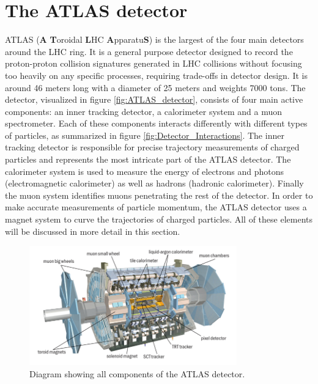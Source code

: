 \section{The ATLAS detector}

ATLAS (\textbf{A} \textbf{T}oroidal \textbf{L}HC \textbf{A}pparatu\textbf{S}) is the largest of the four main detectors 
around the LHC ring. It is a general purpose detector designed to record the proton-proton collision signatures 
generated in LHC collisions without focusing too heavily on any specific processes, requiring trade-offs in detector 
design. It is around 46 meters long with a diameter of 25 meters and weights 7000 tons. The detector, visualized in 
figure \ref{fig:ATLAS_detector}, consists of four main active components: an inner tracking detector, a calorimeter 
system and a muon spectrometer. Each of these components interacts differently with different types of particles, as 
summarized in figure \ref{fig:Detector_Interactions}. The inner tracking detector is responsible for precise trajectory 
measurements of charged particles and represents the most intricate part of the ATLAS detector. The calorimeter system 
is used to measure the energy of electrons and photons (electromagnetic calorimeter) as well as hadrons (hadronic 
calorimeter). Finally the muon system identifies muons penetrating the rest of the detector. In order to make accurate 
measurements of particle momentum, the ATLAS detector uses a magnet system to curve the trajectories of charged 
particles. All of these elements will be discussed in more detail in this section.

\begin{figure}[h!]
\centering
    \includegraphics[width=0.8\textwidth]{images/ATLAS_Detector.jpg}
    \caption{Diagram showing all components of the ATLAS detector.}
    \label{fig:ATLAS_Detector}
\end{figure}

